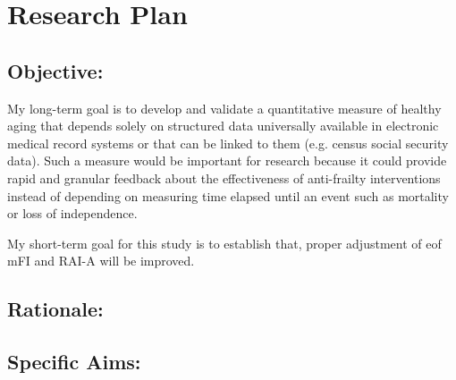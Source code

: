 \section{Research Plan }\label{research-plan}


\subsection{Objective:}\label{objective}
  
My long-term goal is to develop and validate a quantitative measure of healthy aging that depends solely on structured data universally available in electronic medical record systems or that can be linked to them (e.g. census social security data). Such a measure would be important for research because it could provide rapid and granular feedback about the effectiveness of anti-frailty interventions instead of depending on measuring time elapsed until an event such as mortality or loss of independence.

My short-term goal for this study is to establish that, proper adjustment of eof mFI and RAI-A will be improved. 

\subsection{Rationale:}\label{rationale}

\subsection{Specific Aims:}\label{specific-aims}
